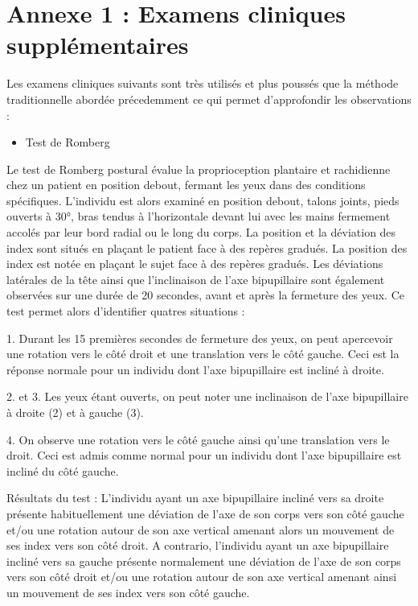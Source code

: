 \section{Annexe 1 : Examens cliniques supplémentaires}
\label{annexe:1}

Les examens cliniques suivants sont très utilisés et plus poussés que la méthode traditionnelle abordée précedemment ce
qui permet d'approfondir les observations :

\begin{itemize}
    \item Test de Romberg
\end{itemize}

Le test de Romberg postural évalue la proprioception plantaire et rachidienne chez un patient en position debout, fermant les yeux dans des conditions spécifiques.  L’individu est alors examiné en position debout, talons joints, pieds ouverts à 30°, bras tendus à l'horizontale devant lui avec les mains fermement accolés par leur bord radial ou le long du corps.  La position et la déviation des index sont situés en plaçant le patient face à des repères gradués. La position des index est notée en plaçant le sujet face à des repères gradués. Les déviations latérales de la tête ainsi que l’inclinaison de l’axe bipupillaire sont également observées sur une durée de 20 secondes, avant et après la fermeture des yeux.
Ce test permet alors d’identifier quatres situations : 

1. Durant les 15 premières secondes de fermeture des yeux, on peut apercevoir une rotation vers le côté droit et une translation vers le côté gauche. Ceci est la réponse normale pour un individu dont l’axe bipupillaire est incliné à droite.

2. et 3.  Les yeux étant ouverts, on peut noter une inclinaison de l’axe bipupillaire à droite (2) et à gauche (3).

4. On observe une rotation vers le côté gauche ainsi qu’une translation vers le droit. Ceci est admis comme normal pour un individu dont l’axe bipupillaire est incliné du côté gauche.

Résultats du test : 
L’individu ayant un axe bipupillaire incliné vers sa droite présente habituellement une déviation de l’axe de son corps vers son côté gauche et/ou une rotation autour de son axe vertical amenant alors un mouvement de ses index vers son côté droit.
A contrario, l’individu ayant un axe bipupillaire incliné vers sa gauche présente normalement une déviation de l’axe de son corps vers son côté droit et/ou une rotation autour de son axe vertical amenant ainsi un mouvement de ses index vers son côté gauche.

